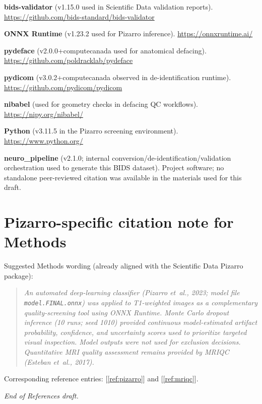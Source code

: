 \documentclass[11pt,letterpaper]{article}
\begin{document}
\begin{enumerate}[leftmargin=*,itemsep=0.55em,label={[S\arabic*]}]

  \item \textbf{bids-validator}
  (v1.15.0 used in Scientific Data validation reports).
  \url{https://github.com/bids-standard/bids-validator}

  \item \textbf{ONNX Runtime}
  (v1.23.2 used for Pizarro inference).
  \url{https://onnxruntime.ai/}

  \item \textbf{pydeface}
  (v2.0.0+computecanada used for anatomical defacing).
  \url{https://github.com/poldracklab/pydeface}

  \item \textbf{pydicom}
  (v3.0.2+computecanada observed in de-identification runtime).
  \url{https://github.com/pydicom/pydicom}

  \item \textbf{nibabel}
  (used for geometry checks in defacing QC workflows).
  \url{https://nipy.org/nibabel/}

  \item \textbf{Python}
  (v3.11.5 in the Pizarro screening environment).
  \url{https://www.python.org/}

  \item \textbf{neuro\_pipeline}
  (v2.1.0; internal conversion/de-identification/validation orchestration used
  to generate this BIDS dataset).
  Project software; no standalone peer-reviewed citation was available in the
  materials used for this draft.

\end{enumerate}

\section{Pizarro-specific citation note for Methods}

Suggested Methods wording (already aligned with the Scientific Data Pizarro
package):

\begin{quote}
\textit{An automated deep-learning classifier
(Pizarro et~al., 2023; model file \texttt{model.FINAL.onnx}) was applied to
T1-weighted images as a complementary quality-screening tool using ONNX Runtime.
Monte Carlo dropout inference (10 runs; seed 1010) provided continuous
model-estimated artifact probability, confidence, and uncertainty scores used
to prioritize targeted visual inspection. Model outputs were not used for
exclusion decisions. Quantitative MRI quality assessment remains provided by
MRIQC (Esteban et~al., 2017).}
\end{quote}

Corresponding reference entries: [\ref{ref:pizarro}] and [\ref{ref:mriqc}].

\vspace{1.5em}
\noindent\textit{End of References draft.}
\end{document}
